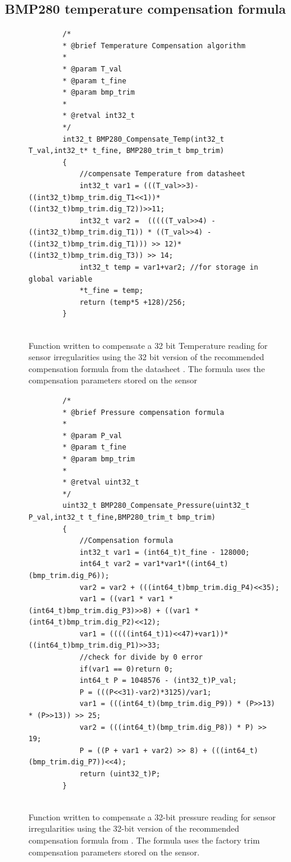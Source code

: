 \subsection{BMP280 temperature compensation formula}
\begin{figure}[H]
	
	\begin{lstlisting}
		/*
		* @brief Temperature Compensation algorithm
		*
		* @param T_val
		* @param t_fine
		* @param bmp_trim
		*
		* @retval int32_t
		*/
		int32_t BMP280_Compensate_Temp(int32_t T_val,int32_t* t_fine, BMP280_trim_t bmp_trim)
		{
			//compensate Temperature from datasheet
			int32_t var1 = (((T_val>>3)- ((int32_t)bmp_trim.dig_T1<<1))*((int32_t)bmp_trim.dig_T2))>>11;
			int32_t var2 =  (((((T_val>>4) - ((int32_t)bmp_trim.dig_T1)) * ((T_val>>4) - ((int32_t)bmp_trim.dig_T1))) >> 12)*((int32_t)bmp_trim.dig_T3)) >> 14;
			int32_t temp = var1+var2; //for storage in global variable
			*t_fine = temp;
			return (temp*5 +128)/256;
		}
		
	\end{lstlisting}
	\caption{Function written to compensate  a 32 bit Temperature reading for sensor irregularities using the 32 bit version of the recommended compensation formula from the datasheet \cite{BMP280_Datasheet}. The formula uses the compensation parameters stored on the sensor}
	\label{fig:bmp_code_comp_T}
\end{figure}

\begin{figure}[H]
	\begin{lstlisting}
		/*
		* @brief Pressure compensation formula
		*
		* @param P_val
		* @param t_fine
		* @param bmp_trim
		*
		* @retval uint32_t
		*/
		uint32_t BMP280_Compensate_Pressure(uint32_t P_val,int32_t t_fine,BMP280_trim_t bmp_trim)
		{
			//Compensation formula
			int32_t var1 = (int64_t)t_fine - 128000;
			int64_t var2 = var1*var1*((int64_t)(bmp_trim.dig_P6));
			var2 = var2 + (((int64_t)bmp_trim.dig_P4)<<35);
			var1 = ((var1 * var1 * (int64_t)bmp_trim.dig_P3)>>8) + ((var1 * (int64_t)bmp_trim.dig_P2)<<12);
			var1 = (((((int64_t)1)<<47)+var1))*((int64_t)bmp_trim.dig_P1)>>33;
			//check for divide by 0 error
			if(var1 == 0)return 0;
			int64_t P = 1048576 - (int32_t)P_val;
			P = (((P<<31)-var2)*3125)/var1;
			var1 = (((int64_t)(bmp_trim.dig_P9)) * (P>>13) * (P>>13)) >> 25;
			var2 = (((int64_t)(bmp_trim.dig_P8)) * P) >> 19;
			P = ((P + var1 + var2) >> 8) + (((int64_t)(bmp_trim.dig_P7))<<4);
			return (uint32_t)P;
		}
		
	\end{lstlisting}
	\caption{Function written to compensate  a 32-bit pressure reading for sensor irregularities using the 32-bit version of the recommended compensation formula from \cite{BMP280_Datasheet}. The formula uses the factory trim compensation parameters stored on the sensor.}
	\label{fig:bmp_code_comp_P}
\end{figure}

